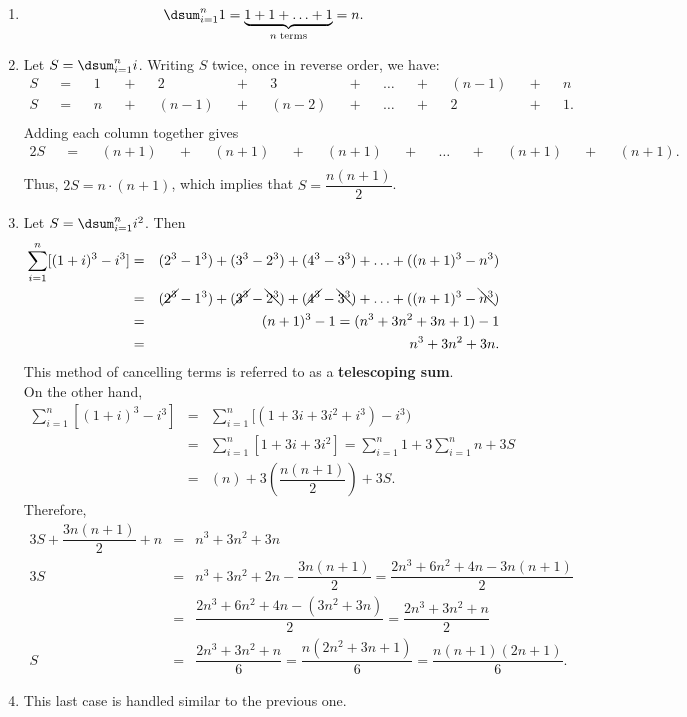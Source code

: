 \documentclass{book}
\begin{document}
\begin{pf}\mbox{}
\begin{enumerate}
\item \[\dsum_{i=1}^n 1 = \underbrace{1+1+\ldots + 1}_{n\; \text{terms}} = n.\]\vs

\item Let $S = \dsum_{i=1}^n i$. Writing $S$ twice, once in reverse order, we have: 
\begin{align*}
S && = && 1                  && + && 2                         && + && 3                        && + && \mbox{$\ldots$} && + && \mbox{$(n-1)$} && + && \mbox{$n$}\\
S && = && \mbox{$n$} && + && \mbox{$(n-1)$} && + && \mbox{$(n-2)$} && + && \mbox{$\ldots$} && + && 2                        && + && 1. \\
\end{align*} Adding each column together gives
\begin{align*}
2S && = && \mbox{$(n+1)$} && + && \mbox{$(n+1)$} && + && \mbox{$(n+1)$} && + && \mbox{$\ldots$} && + && \mbox{$(n+1)$} && + && \mbox{$(n+1)$}. \\
\end{align*} Thus, $2S = n\cdot(n+1)$, which implies that $S = \dfrac{n(n+1)}{2}$.\\

\item  Let $S = \dsum_{i=1}^n i^2$. Then 
\begin{eqnarray*}
\sum_{i=1}^n [(1+i)^3 - i^3] &=& (2^3 - 1^3) + (3^3-2^3) + (4^3-3^3) + \ldots + ((n+1)^3-n^3)\\
&=& (\cancel{2^3} - 1^3) + (\cancel{3^3}-\bcancel{2^3}) + (\cancel{4^3}-\bcancel{3^3}) + \ldots + ((n+1)^3-\bcancel{n^3})\\
&=& (n+1)^3 - 1 = (n^3+3n^2+3n+1) - 1\\
&=& n^3+3n^2+3n.
\end{eqnarray*} This method of cancelling terms is referred to as a \textbf{telescoping sum}.\\

On the other hand, 
\begin{eqnarray*}
\sum_{i=1}^n [(1+i)^3 - i^3] &=& \sum_{i=1}^n [ (1+3i + 3i^2 + i^3) - i^3)\\
&=& \sum_{i=1}^n [1+3i+3i^2] = \sum_{i=1}^n 1 + 3\sum_{i=1}^n n + 3S\\
&=& (n) + 3\left(\dfrac{n(n+1)}{2}\right) + 3S.
\end{eqnarray*} Therefore, 
\begin{eqnarray*}
3S + \dfrac{3n(n+1)}{2} + n &=& n^3+3n^2+3n\\
3S &=& n^3+3n^2+2n - \dfrac{3n(n+1)}{2} = \dfrac{2n^3 + 6n^2+4n - 3n(n+1)}{2}\\
&=& \dfrac{2n^3 + 6n^2+4n - (3n^2+3n)}{2} = \dfrac{2n^3+3n^2+n}{2}\\
S &=&  \dfrac{2n^3+3n^2+n}{6} =  \dfrac{n(2n^2+3n+1)}{6} = \dfrac{n(n+1)(2n+1)}{6}.
\end{eqnarray*}

\item This last case is handled similar to the previous one. 
\end{enumerate}
\end{pf}\vs
\end{document}
